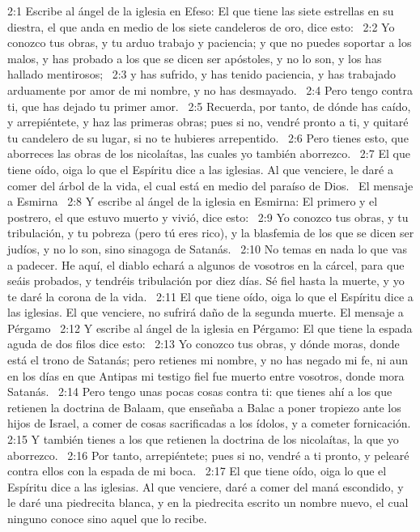 2:1 Escribe al ángel de la iglesia en Efeso: El que tiene las siete estrellas en su diestra, el que anda en medio de los siete candeleros de oro, dice esto:  
2:2 Yo conozco tus obras, y tu arduo trabajo y paciencia; y que no puedes soportar a los malos, y has probado a los que se dicen ser apóstoles, y no lo son, y los has hallado mentirosos;  
2:3 y has sufrido, y has tenido paciencia, y has trabajado arduamente por amor de mi nombre, y no has desmayado.  
2:4 Pero tengo contra ti, que has dejado tu primer amor.  
2:5 Recuerda, por tanto, de dónde has caído, y arrepiéntete, y haz las primeras obras; pues si no, vendré pronto a ti, y quitaré tu candelero de su lugar, si no te hubieres arrepentido.  
2:6 Pero tienes esto, que aborreces las obras de los nicolaítas, las cuales yo también aborrezco.  
2:7 El que tiene oído, oiga lo que el Espíritu dice a las iglesias. Al que venciere, le daré a comer del árbol de la vida, el cual está en medio del paraíso de Dios.  
El mensaje a Esmirna  
2:8 Y escribe al ángel de la iglesia en Esmirna: El primero y el postrero, el que estuvo muerto y vivió, dice esto:  
2:9 Yo conozco tus obras, y tu tribulación, y tu pobreza (pero tú eres rico), y la blasfemia de los que se dicen ser judíos, y no lo son, sino sinagoga de Satanás.  
2:10 No temas en nada lo que vas a padecer. He aquí, el diablo echará a algunos de vosotros en la cárcel, para que seáis probados, y tendréis tribulación por diez días. Sé fiel hasta la muerte, y yo te daré la corona de la vida.  
2:11 El que tiene oído, oiga lo que el Espíritu dice a las iglesias. El que venciere, no sufrirá daño de la segunda muerte. 
El mensaje a Pérgamo  
2:12 Y escribe al ángel de la iglesia en Pérgamo: El que tiene la espada aguda de dos filos dice esto:  
2:13 Yo conozco tus obras, y dónde moras, donde está el trono de Satanás; pero retienes mi nombre, y no has negado mi fe, ni aun en los días en que Antipas mi testigo fiel fue muerto entre vosotros, donde mora Satanás.  
2:14 Pero tengo unas pocas cosas contra ti: que tienes ahí a los que retienen la doctrina de Balaam, que enseñaba a Balac a poner tropiezo ante los hijos de Israel, a comer de cosas sacrificadas a los ídolos, y a cometer fornicación. 
2:15 Y también tienes a los que retienen la doctrina de los nicolaítas, la que yo aborrezco.  
2:16 Por tanto, arrepiéntete; pues si no, vendré a ti pronto, y pelearé contra ellos con la espada de mi boca.  
2:17 El que tiene oído, oiga lo que el Espíritu dice a las iglesias. Al que venciere, daré a comer del maná escondido, y le daré una piedrecita blanca, y en la piedrecita escrito un nombre nuevo, el cual ninguno conoce sino aquel que lo recibe.  
